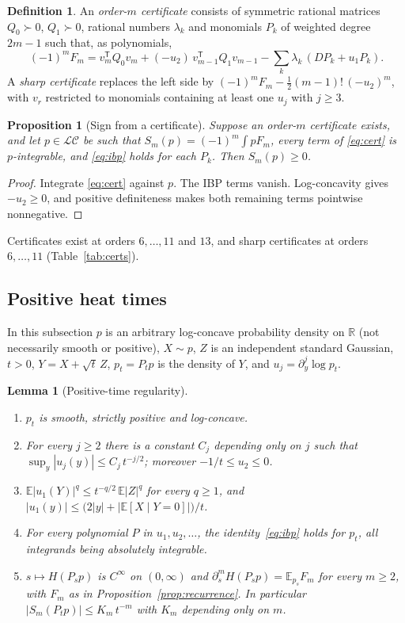 \documentclass[11pt]{article}
\newtheorem{proposition}[theorem]{Proposition}
\newtheorem{lemma}[theorem]{Lemma}
\theoremstyle{definition}
\newtheorem{definition}[theorem]{Definition}
\theoremstyle{remark}
\newcommand{\R}{\mathbb R}
\newcommand{\E}{\mathbb E}
\begin{document}
\begin{definition}\label{def:cert}
An \emph{order-$m$ certificate} consists of symmetric rational matrices
$Q_0\succ0$, $Q_1\succ0$, rational numbers $\lambda_k$ and monomials $P_k$ of weighted
degree $2m-1$ such that, as polynomials,
\begin{equation}\label{eq:cert}
 (-1)^mF_m=v_m^{\mathsf T}Q_0v_m+(-u_2)\,v_{m-1}^{\mathsf T}Q_1v_{m-1}
 -\sum_k\lambda_k\,(DP_k+u_1P_k).
\end{equation}
A \emph{sharp certificate} replaces the left side by
$(-1)^mF_m-\tfrac12(m-1)!\,(-u_2)^m$, with $v_r$ restricted to monomials containing
at least one $u_j$ with $j\ge3$.
\end{definition}

\begin{proposition}[Sign from a certificate]\label{prop:sign}
Suppose an order-$m$ certificate exists, and let $p\in\mathcal{LC}$ be such that
$S_m(p)=(-1)^m\int pF_m$, every term of \eqref{eq:cert} is $p$-integrable, and
\eqref{eq:ibp} holds for each $P_k$. Then $S_m(p)\ge0$.
\end{proposition}
\begin{proof}
Integrate \eqref{eq:cert} against $p$. The IBP terms vanish. Log-concavity gives
$-u_2\ge0$, and positive definiteness makes both remaining terms pointwise
nonnegative.
\end{proof}

Certificates exist at orders $6,\dots,11$ and $13$, and sharp certificates at orders
$6,\dots,11$ (Table~\ref{tab:certs}).

\subsection{Positive heat times}\label{sec:positive-time}
In this subsection $p$ is an arbitrary log-concave probability density on $\R$ (not
necessarily smooth or positive), $X\sim p$, $Z$ is an independent standard Gaussian,
$t>0$, $Y=X+\sqrt t\,Z$, $p_t=P_tp$ is the density of $Y$, and $u_j=\partial_y^j\log p_t$.

\begin{lemma}[Positive-time regularity]\label{lem:positive}
\begin{enumerate}[label=(\alph*)]
\item $p_t$ is smooth, strictly positive and log-concave.
\item For every $j\ge2$ there is a constant $C_j$ depending only on $j$ such that
 $\sup_y|u_j(y)|\le C_j\,t^{-j/2}$; moreover $-1/t\le u_2\le0$.
\item $\E|u_1(Y)|^q\le t^{-q/2}\,\E|Z|^q$ for every $q\ge1$, and
 $|u_1(y)|\le\bigl(2|y|+|\E[X\mid Y=0]|\bigr)/t$.
\item For every polynomial $P$ in $u_1,u_2,\dots$, the identity~\eqref{eq:ibp} holds
 for $p_t$, all integrands being absolutely integrable.
\item $s\mapsto H(P_sp)$ is $C^\infty$ on $(0,\infty)$ and
 $\partial_s^mH(P_sp)=\E_{p_s}F_m$ for every $m\ge2$, with $F_m$ as in
 Proposition~\ref{prop:recurrence}. In particular $|S_m(P_tp)|\le K_m\,t^{-m}$ with
 $K_m$ depending only on $m$.
\end{enumerate}
\end{lemma}
\end{document}
